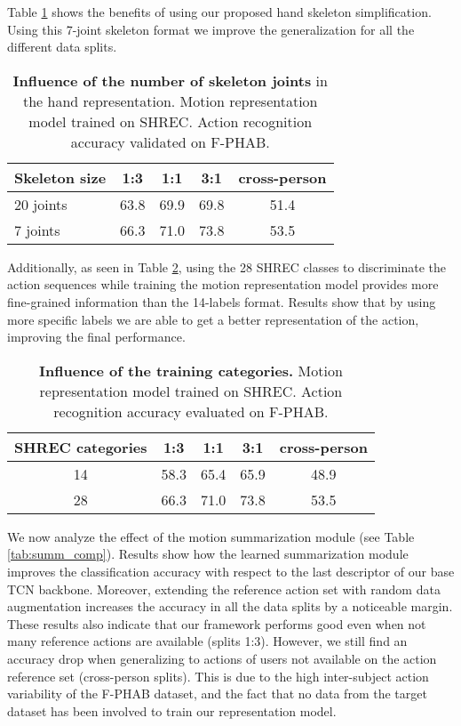 \documentclass[letterpaper, 10 pt, conference]{ieeeconf}
\begin{document}
Table \ref{tab:skel_size} shows the benefits of using our proposed hand skeleton simplification. Using this 7-joint skeleton format we improve the generalization for all the different data splits.

\begin{table}[ht]
\centering
\begin{tabular}{|l|c|c|c|c|}
\hline
\textbf{Skeleton size} & \textbf{1:3} & \textbf{1:1} & \textbf{3:1} & \textbf{cross-person} \\ \hline
20 joints & 63.8 & 69.9 & 69.8 & 51.4 \\ \hline
7 joints & 66.3 & 71.0 & 73.8 & 53.5 \\ \hline
\end{tabular}
\caption{\textbf{Influence of the number of skeleton joints} in the hand representation. Motion representation model trained on SHREC. Action recognition accuracy validated on F-PHAB. }
\label{tab:skel_size}
\end{table}


Additionally, as seen in Table \ref{tab:train_labels}, using the 28 SHREC classes to discriminate the action sequences while training the motion representation model provides more fine-grained information than the 14-labels format. Results show that by using more specific labels we are able to get a better representation of the action, improving the final performance.

\begin{table}[ht]
\centering
\begin{tabular}{|c|c|c|c|c|}
\hline
\textbf{SHREC categories} & \textbf{1:3} & \textbf{1:1} & \textbf{3:1} & \textbf{cross-person} \\ \hline
14 & 58.3 & 65.4 & 65.9 & 48.9 \\ \hline
28 & 66.3 & 71.0 & 73.8 & 53.5 \\ \hline
\end{tabular}
\caption{\textbf{Influence of the training categories.} Motion representation model trained on SHREC. Action recognition accuracy evaluated on F-PHAB.}
\label{tab:train_labels}
\end{table}



We now analyze the effect of the motion summarization module (see Table \ref{tab:summ_comp}). 
Results show how the learned summarization module improves the classification accuracy with respect to the last descriptor of our base TCN backbone.
Moreover, extending the reference action set with random data augmentation increases the accuracy in all the data splits by a noticeable margin.
These results also indicate that our framework performs good even when not many reference actions are available (splits 1:3). However, we still find an accuracy drop when generalizing to actions of users not available on the action reference set (cross-person splits). This is due to the high inter-subject action variability of the F-PHAB dataset, and the fact that no data from the target dataset has been involved to train our representation model.
\end{document}
